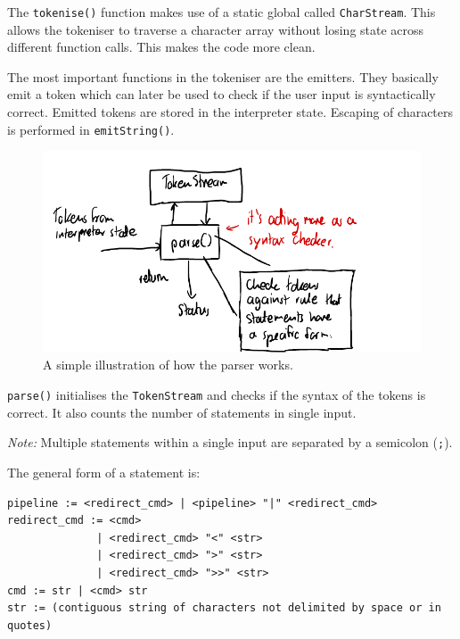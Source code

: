 \documentclass[12pt]{article}
\begin{document}
\newpage



The \texttt{tokenise()} function makes use of a static global
called \texttt{CharStream}. This allows the tokeniser to
traverse a character array without losing state across different
function calls. This makes the code more clean.



The most important functions in the tokeniser are the emitters.
They basically emit a token which can later be used to check if
the user input is syntactically correct. Emitted tokens are
stored in the interpreter state. Escaping of characters is
performed in \texttt{emitString()}.

\begin{figure}[H]
\centering
\includegraphics{parser}
\caption{A simple illustration of how the parser works.}
\end{figure}



\texttt{parse()} initialises the \texttt{TokenStream} and checks
if the syntax of the tokens is correct. It also counts the
number of statements in single input.

\textit{Note:} Multiple statements within a single input are
separated by a semicolon (\texttt{;}).

The general form of a statement is:

\begin{verbatim}
pipeline := <redirect_cmd> | <pipeline> "|" <redirect_cmd>
redirect_cmd := <cmd>
              | <redirect_cmd> "<" <str>
              | <redirect_cmd> ">" <str>
              | <redirect_cmd> ">>" <str> 
cmd := str | <cmd> str
str := (contiguous string of characters not delimited by space or in quotes)
\end{verbatim}
\end{document}
